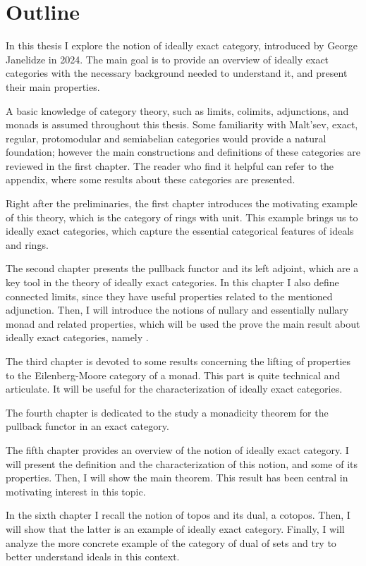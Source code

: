 \chapter*{Outline}
\fontsize{12}{14.5}\selectfont

In this thesis I explore the notion of ideally exact category, introduced by George Janelidze in 2024. The main goal is to provide an overview of ideally exact categories with the necessary background needed to understand it, and present their main properties.

A basic knowledge of category theory, such as limits, colimits, adjunctions, and monads is assumed throughout this thesis. Some familiarity with Malt'sev, exact, regular, protomodular and semiabelian categories would provide a natural foundation; however the main constructions and definitions of these categories are reviewed in the first chapter. The reader who find it helpful can refer to the appendix, where some results about these categories are presented.

Right after the preliminaries, the first chapter introduces the motivating example of this theory, which is the category of rings with unit. This example brings us to ideally exact categories, which capture the essential categorical features of ideals and rings.

The second chapter presents the pullback functor and its left adjoint, which are a key tool in the theory of ideally exact categories. In this chapter I also define connected limits, since they have useful properties related to the mentioned adjunction. Then, I will introduce the notions of nullary and essentially nullary monad and related properties, which will be used the prove the main result about ideally exact categories, namely .

The third chapter is devoted to some results concerning the lifting of properties to the Eilenberg-Moore category of a monad. This part is quite technical and articulate. It will be useful for the characterization of ideally exact categories.

The fourth chapter is dedicated to the study a monadicity theorem for the pullback functor in an exact category.

The fifth chapter provides an overview of the notion of ideally exact category. I will present the definition and the characterization of this notion, and some of its properties. Then, I will show the main theorem. This result has been central in motivating interest in this topic.

In the sixth chapter I recall the notion of topos and its dual, a cotopos. Then, I will show that the latter is an example of ideally exact category. Finally, I will analyze the more concrete example of the category of dual of sets and try to better understand ideals in this
context.

\clearpage
\newpage
\mbox{}
\clearpage
